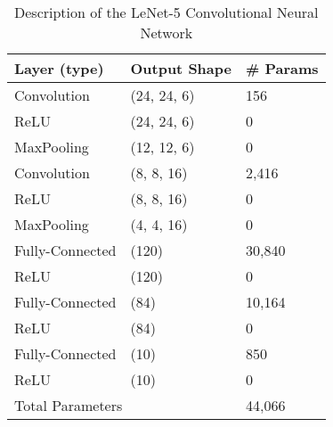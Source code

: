 \begin{table}
	\begin{tabularx}{\columnwidth}{|X|X|X|} \hline
		Layer (type) & Output Shape & \# Params \\ \hline\hline
		Convolution  & (24, 24, 6) & 156 \\
		ReLU & (24, 24, 6) & 0 \\
		MaxPooling & (12, 12, 6) & 0 \\
		Convolution & (8, 8, 16) & 2,416 \\
		ReLU & (8, 8, 16) & 0 \\
		MaxPooling & (4, 4, 16) & 0 \\
		Fully-Connected & (120) & 30,840 \\
		ReLU & (120) & 0 \\
		Fully-Connected & (84) & 10,164 \\
		ReLU & (84) & 0 \\
		Fully-Connected & (10) & 850 \\
		ReLU & (10) & 0 \\ \hline
		\multicolumn{2}{|l|}{Total Parameters} & 44,066 \\\hline
	\end{tabularx}
\caption{Description of the LeNet-5 Convolutional Neural Network}
\end{table}

